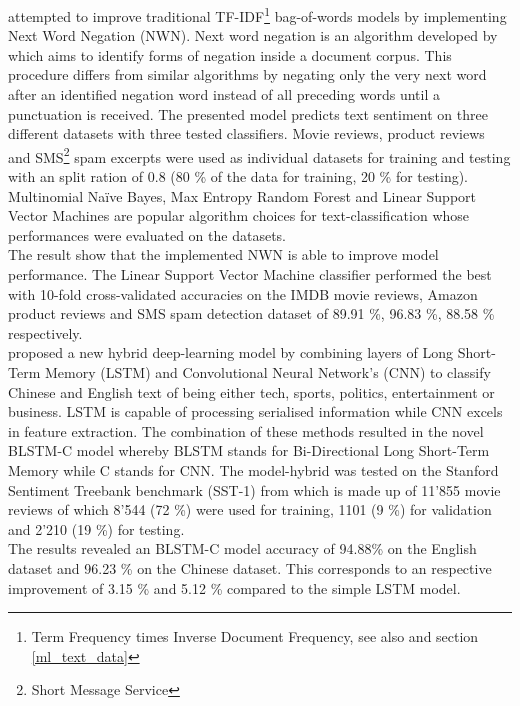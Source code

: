 \textcite{Das2018} attempted to improve traditional TF-IDF\footnote{Term Frequency times Inverse Document Frequency, see also  and section \ref{ml_text_data}} bag-of-words models by implementing Next Word Negation (NWN). Next word negation is an algorithm developed by \textcite{Das2018} which aims to identify forms of negation inside a document corpus. This procedure differs from similar algorithms by negating only the very next word after an identified negation word instead of all preceding words until a punctuation is received. The presented model predicts text sentiment on three different datasets with three tested classifiers. Movie reviews, product reviews and SMS\footnote{Short Message Service} spam excerpts were used as individual datasets for training and testing with an split ration of 0.8 (80 \% of the data for training, 20 \%  for testing). Multinomial Na\"ive Bayes, Max Entropy Random Forest and Linear Support Vector Machines are popular algorithm choices for text-classification whose performances were evaluated on the datasets. \\
The result show that the implemented NWN is able to improve model performance. The Linear Support Vector Machine classifier performed the best with 10-fold cross-validated accuracies on the IMDB movie reviews, Amazon product reviews and SMS spam detection dataset of 89.91 \%, 96.83 \%, 88.58 \% respectively. \\

\textcite{Li2018} proposed a new hybrid deep-learning model by combining layers of Long Short-Term Memory (LSTM) and Convolutional Neural Network's (CNN) to classify Chinese and English text of being either tech, sports, politics, entertainment or business. LSTM is capable of processing serialised information while CNN excels in feature extraction. The combination of these methods resulted in the novel BLSTM-C model whereby BLSTM stands for Bi-Directional Long Short-Term Memory while C stands for CNN. The model-hybrid was tested on the Stanford Sentiment Treebank benchmark (SST-1) from \textcite{Socher2013} which is made up of 11'855 movie reviews of which 8'544 (72 \%) were used for training, 1101 (9 \%) for validation and 2'210 (19 \%) for testing. \\The results revealed an BLSTM-C model accuracy
of 94.88\% on the English dataset and 96.23 \% on the Chinese dataset. This corresponds to an respective improvement of 3.15 \% and 5.12 \% compared to the simple LSTM model.


